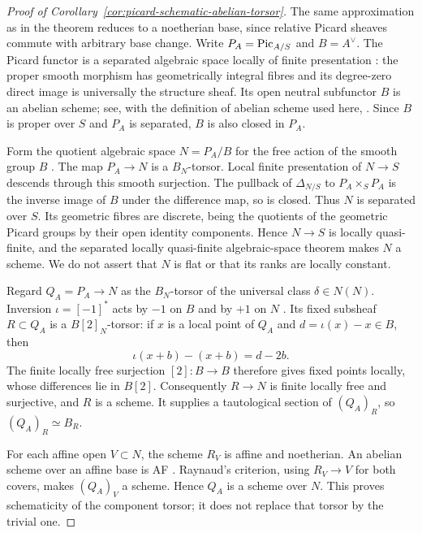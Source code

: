 \begin{proof}[Proof of Corollary~\ref{cor:picard-schematic-abelian-torsor}]
The same approximation as in the theorem reduces to a noetherian
base, since relative Picard sheaves commute with arbitrary base
change. Write $P_A=\operatorname{Pic}_{A/S}$ and $B=A^\vee$.
The Picard functor is a separated algebraic space locally of finite
presentation \cite[Section~108.9, Lemmas~3--4]{Stacks}:
the proper smooth morphism has geometrically integral fibres and
its degree-zero direct image is universally the structure sheaf.
Its open neutral subfunctor $B$ is an abelian scheme; see,
with the definition of abelian scheme used here,
\cite[Corollary~4.6, author version pp.~14--15]{LaurentSchroer}.
Since $B$ is proper over $S$ and $P_A$ is separated, $B$ is also
closed in $P_A$.

Form the quotient algebraic space $N=P_A/B$ for the free action
of the smooth group $B$ \cite[Tag~06PH]{Stacks}. The map $P_A\to N$ is a $B_N$-torsor.
Local finite presentation of $N\to S$ descends through this smooth
surjection. The pullback of $\Delta_{N/S}$ to $P_A\times_S P_A$
is the inverse image of $B$ under the difference map, so is closed.
Thus $N$ is separated over $S$. Its geometric fibres are discrete,
being the quotients of the geometric Picard groups by their open
identity components. Hence $N\to S$ is locally quasi-finite, and
the separated locally quasi-finite algebraic-space theorem
\cite[Tag~03XX]{Stacks} makes $N$ a scheme. We do not assert
that $N$ is flat or that its ranks are locally constant.

Regard $Q_A=P_A\to N$ as the $B_N$-torsor of the universal class
$\delta\in N(N)$. Inversion $\iota=[-1]^*$ acts by $-1$ on $B$
and by $+1$ on $N$
\cite[\S\S3.1--3.2, pp.~1311--1312]{PR}.
Its fixed subsheaf $R\subset Q_A$ is a $B[2]_N$-torsor:
if $x$ is a local point of $Q_A$ and $d=\iota(x)-x\in B$, then
\[
 \iota(x+b)-(x+b)=d-2b.
\]
The finite locally free surjection $[2]:B\to B$ therefore gives
fixed points locally, whose differences lie in $B[2]$.
Consequently $R\to N$ is finite locally free and surjective, and
$R$ is a scheme. It supplies a tautological section of $(Q_A)_R$,
so $(Q_A)_R\simeq B_R$.

For each affine open $V\subset N$, the scheme $R_V$ is affine and
noetherian. An abelian scheme over an affine base is AF
\cite[application after Corollary~3.8, p.~5-15]{RaynaudDescent}.
Raynaud's criterion, using $R_V\to V$ for both covers, makes
$(Q_A)_V$ a scheme. Hence $Q_A$ is a scheme over $N$.
This proves schematicity of the component torsor; it does not
replace that torsor by the trivial one.


\end{proof}
